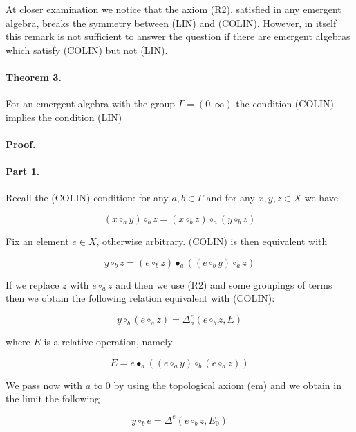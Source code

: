 \documentclass{article}
\begin{document}
At closer examination we notice that the axiom (R2), satisfied in any emergent algebra, breaks the symmetry between (LIN) and (COLIN). However, in itself this remark is not sufficient to answer the question if there are emergent algebras which satisfy (COLIN) but not (LIN).

\paragraph{Theorem 3.} For an emergent algebra with the group $\Gamma = (0,\infty)$ the condition (COLIN) implies the condition (LIN)



\paragraph{Proof. }  \paragraph{Part 1.} Recall the (COLIN) condition: for any $a, b \in \Gamma$ and for any $x, y, z \in X$ we have 



$$ (x \circ_{a} y) \circ_{b} z = (x \circ_{b} z) \circ_{a} (y \circ_{b} z)$$



Fix an element $e \in X$, otherwise arbitrary. (COLIN) is then equivalent with 



$$ y \circ_{b} z = (e \circ_{b} z) \bullet_{a} ((e \circ_{b} y) \circ_{a} z)$$



If we replace $z$ with $e \circ_{a} z$ and then we use (R2) and some groupings of terms then we obtain the following relation equivalent with (COLIN):



$$ y \circ_{b} (e \circ_{a} z) = \Delta_{a}^{e}(e \circ_{b} z, E)$$



where $E$ is a relative operation, namely 



$$ E = e \bullet_{a} ((e \circ_{a} y) \circ_{b} (e \circ_{a} z))$$



We pass now with $a$ to $0$ by using the topological axiom (em) and we obtain in the limit the following 



$$ y \circ_{b} e = \Delta^{e}(e \circ_{b} z, E_{0})$$
\end{document}
